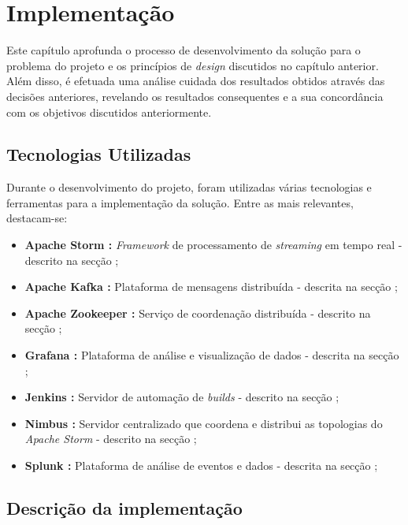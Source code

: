 \chapter{Implementação}
\label{sec:5-Implementacao}

Este capítulo aprofunda o processo de desenvolvimento da solução para o problema do projeto e os 
princípios de \textit{design} discutidos no capítulo anterior. Além disso, é efetuada uma análise 
cuidada dos resultados obtidos através das decisões anteriores, revelando os resultados
consequentes e a sua concordância com os objetivos discutidos anteriormente.

\section{Tecnologias Utilizadas}

Durante o desenvolvimento do projeto, foram utilizadas várias tecnologias e ferramentas para a 
implementação da solução. Entre as mais relevantes, destacam-se:

\begin{itemize}
  \item \textbf{Apache Storm \cite{storm}:} \textit{Framework} de processamento de 
    \textit{streaming} em tempo real - descrito na secção ;
  \item \textbf{Apache Kafka \cite{kafka}:} Plataforma de mensagens distribuída - descrita na 
    secção ;
  \item \textbf{Apache Zookeeper \cite{zookeeper}:} Serviço de coordenação distribuída - descrito 
    na secção ;
  \item \textbf{Grafana \cite{grafana}:} Plataforma de análise e visualização de dados - descrita 
    na secção ;
  \item \textbf{Jenkins \cite{jenkins}:} Servidor de automação de \textit{builds} - descrito na 
    secção ;
  \item \textbf{Nimbus \cite{nimbus}:} Servidor centralizado que coordena e distribui as topologias 
    do \textit{Apache Storm} - descrito na secção ;
  \item \textbf{Splunk \cite{splunk}:} Plataforma de análise de eventos e dados - descrita na 
    secção ;
\end{itemize}

\section{Descrição da implementação}

